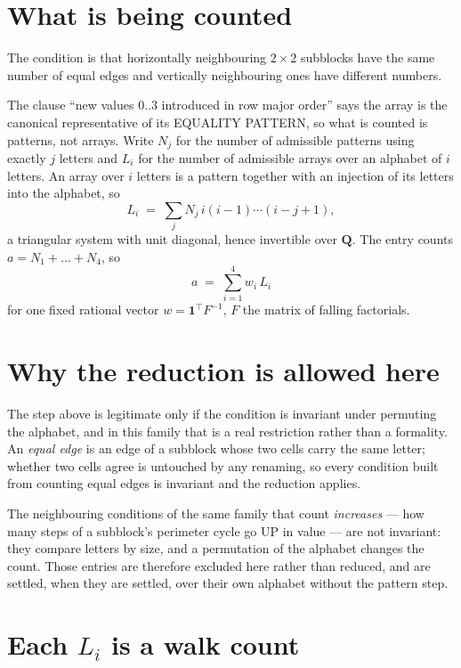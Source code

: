 \documentclass[11pt,a4paper]{article}
\theoremstyle{plain}
\theoremstyle{definition}
\begin{document}
\section{What is being counted}

The condition is that horizontally neighbouring $2\times2$ subblocks have the same number of equal edges and vertically neighbouring ones have different numbers.

The clause ``new values $0..3$ introduced in row major order'' says the array is the
canonical representative of its EQUALITY PATTERN, so what is counted is patterns, not arrays.
Write $N_j$ for the number of admissible patterns using exactly $j$ letters and $L_i$ for the
number of admissible arrays over an alphabet of $i$ letters. An array over $i$ letters is a
pattern together with an injection of its letters into the alphabet, so
\[
L_i\;=\;\sum_j N_j\,i(i-1)\cdots(i-j+1),
\]
a triangular system with unit diagonal, hence invertible over $\mathbf{Q}$. The entry counts
$a=N_1+\dots+N_{4}$, so
\[
a\;=\;\sum_{i=1}^{4}w_i\,L_i
\]
for one fixed rational vector $w=\mathbf{1}^{\!\top}F^{-1}$, $F$ the matrix of falling
factorials.

\section{Why the reduction is allowed here}

The step above is legitimate only if the condition is invariant under permuting the alphabet,
and in this family that is a real restriction rather than a formality. An \emph{equal edge}
is an edge of a subblock whose two cells carry the same letter; whether two cells agree is
untouched by any renaming, so every condition built from counting equal edges is invariant and
the reduction applies.

The neighbouring conditions of the same family that count \emph{increases} --- how many steps
of a subblock's perimeter cycle go UP in value --- are not invariant: they compare letters by
size, and a permutation of the alphabet changes the count. Those entries are therefore excluded
here rather than reduced, and are settled, when they are settled, over their own alphabet
without the pattern step.

\section{Each $L_i$ is a walk count}
\end{document}
